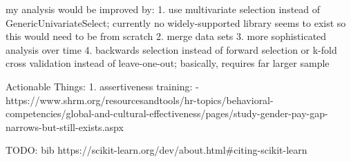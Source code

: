 \documentclass[review]{elsarticle}
\begin{document}


my analysis would be improved by:
  1. use multivariate selection instead of GenericUnivariateSelect; currently no widely-supported library seems to exist so this would need to be from scratch
  2. merge data sets
  3. more sophisticated analysis over time
  4. backwards selection instead of forward selection or k-fold cross validation instead of leave-one-out; basically, requires far larger sample

  Actionable Things:
  1.  assertiveness training:
   - https://www.shrm.org/resourcesandtools/hr-topics/behavioral-competencies/global-and-cultural-effectiveness/pages/study-gender-pay-gap-narrows-but-still-exists.aspx




TODO: bib https://scikit-learn.org/dev/about.html#citing-scikit-learn
\end{document}
